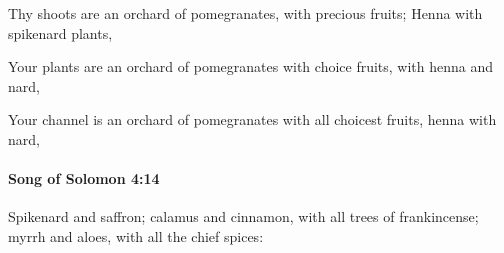 			\begin{versebox}
					\item[BHS] 
					\item[LXX] 
					\item[ASV] Thy shoots are an orchard of pomegranates, with precious fruits; Henna with spikenard plants,
					\item[NIV] Your plants are an orchard of pomegranates with choice fruits, with henna and nard,
					\item[NRSV] Your channel is an orchard of pomegranates with all choicest fruits, henna with nard,
			\end{versebox}

		\paragraph{Song of Solomon 4:14} %
			\label{SONGOFSOLOMON-4-14}

			Spikenard and saffron; calamus and cinnamon, with all trees of frankincense; myrrh and aloes, with all the chief spices:

